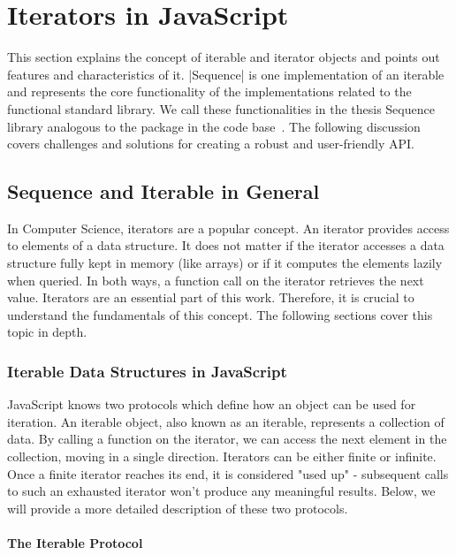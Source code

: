 \chapter{Iterators in JavaScript} %
\label{chap:Iterators in JavaScript}
This section explains the concept of iterable and iterator objects and points
out features and characteristics of it. |Sequence| is one implementation of
an iterable and represents the core functionality of the implementations
related to the functional standard library. We call these functionalities in
the thesis Sequence library analogous to the package in the code
base~\cite{wildwyss_kolibri}. The following
discussion covers challenges and solutions for creating a robust and
user-friendly API.

\section{Sequence and Iterable in General}
\label{sec:Sequence and Iterable in General}
In Computer Science, iterators are a popular concept. An iterator provides
access to elements of a data structure. It does not matter if the iterator
accesses a data structure fully kept in memory (like arrays) or if it computes
the elements lazily when queried. In both ways, a function call on the iterator
retrieves the next value. Iterators are an essential part of this work.
Therefore, it is crucial to understand the fundamentals of this concept. The
following sections cover this topic in depth.

\subsection{Iterable Data Structures in JavaScript}
\label{sub:Iterable data structures in JS}
JavaScript knows two protocols which define how an object can be used for
iteration. An iterable object, also known as an iterable, represents a
collection of data. By calling a function on the iterator, we can access the
next element in the collection, moving in a single direction. Iterators can be
either finite or infinite. Once a finite iterator reaches its end, it is
considered "used up" - subsequent calls to such an exhausted iterator won't
produce any meaningful results. Below, we will provide a more detailed
description of these two protocols.

\subsubsection{The Iterable Protocol}
\label{subsub:The Iterable Protocol}

